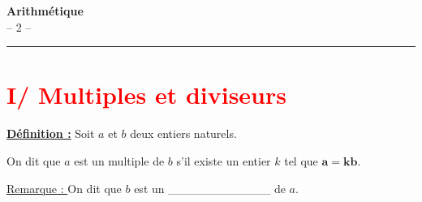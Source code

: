 \documentclass[12pt]{article}
\begin{document}

\newpage

\begin{center}
    {\LARGE \textbf{Arithmétique}}\\[4mm]
    {\large -- 2 --}
\end{center}

\vspace{10pt}
\hrule
\vspace{0pt}


\section*{\textcolor{red}{I/ Multiples et diviseurs}}

\vspace{5pt}

\begin{mdframed}[
    linewidth=1pt,
    roundcorner=5pt,
    linecolor=ForestGreen,
    innertopmargin=10pt,
    innerbottommargin=10pt
]
{\color{ForestGreen}
\textbf{\underline{Définition :}}}
Soit $a$ et $b$ deux entiers naturels.

\vspace{5pt}
On dit que $a$ est un multiple de $b$ s’il existe un entier $k$ tel que $\bm{a = kb}$.

\end{mdframed}

\vspace{5pt}
\underline{Remarque : } On dit que $b$ est un \_\_\_\_\_\_\_\_\_\_\_\_ de $a$.
\end{document}
